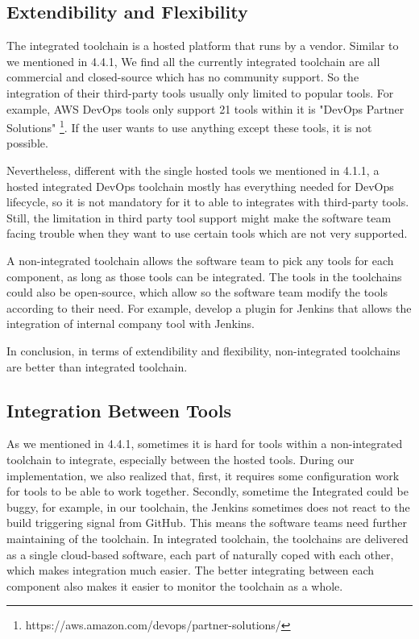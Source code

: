 \subsection{Extendibility and Flexibility}
The integrated toolchain is a hosted platform that runs by a vendor. Similar to we mentioned in 4.4.1, We find all the currently integrated toolchain are all commercial and closed-source which has no community support. So the integration of their third-party tools usually only limited to popular tools. For example, AWS DevOps tools only support 21 tools within it is "DevOps Partner Solutions" \footnote{https://aws.amazon.com/devops/partner-solutions/}. If the user wants to use anything except these tools, it is not possible.
\par
Nevertheless, different with the single hosted tools we mentioned in 4.1.1, a hosted integrated DevOps toolchain mostly has everything needed for DevOps lifecycle, so it is not mandatory for it to able to integrates with third-party tools. Still, the limitation in third party tool support might make the software team facing trouble when they want to use certain tools which are not very supported.
\par
A non-integrated toolchain allows the software team to pick any tools for each component, as long as those tools can be integrated. The tools in the toolchains could also be open-source, which allow so the software team modify the tools according to their need. For example, develop a plugin for Jenkins that allows the integration of internal company tool with Jenkins.
\par
In conclusion, in terms of extendibility and flexibility, non-integrated toolchains are better than integrated toolchain.
\subsection{Integration Between Tools}
As we mentioned in 4.4.1, sometimes it is hard for tools within a non-integrated toolchain to integrate, especially between the hosted tools. 
During our implementation, we also realized that, first, it requires some configuration work for tools to be able to work together. Secondly, sometime the Integrated could be buggy, for example, in our toolchain, the Jenkins sometimes does not react to the build triggering signal from GitHub. This means the software teams need further maintaining of the toolchain.
In integrated toolchain, the toolchains are delivered as a single cloud-based software, each part of naturally coped with each other, which makes integration much easier.
The better integrating between each component also makes it easier to monitor the toolchain as a whole.
